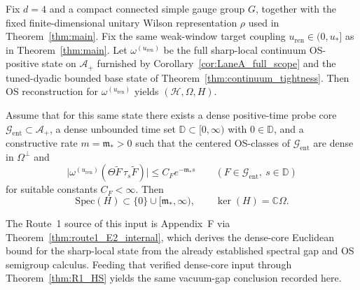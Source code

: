 \label{sec:R1HS_intake}

\begin{theorem}\label{thm:R1_HS}
Fix $d=4$ and a compact connected simple gauge group $G$, together with the fixed finite-dimensional unitary Wilson representation $\rho$ used in Theorem~\ref{thm:main}.
Fix the same weak-window target coupling $u_{\mathrm{ren}}\in(0,u_\ast]$ as in Theorem~\ref{thm:main}. Let $\omega^{(u_{\mathrm{ren}})}$ be the full sharp-local continuum OS-positive state on $\mathcal A_+$ furnished by Corollary~\ref{cor:LaneA_full_scope} and the tuned-dyadic bounded base state of Theorem~\ref{thm:continuum_tightness}. Then OS reconstruction for $\omega^{(u_{\mathrm{ren}})}$ yields $(\mathcal H,\Omega,H)$.

Assume that for this same state there exists a dense positive-time probe core $\mathcal G_{\mathrm{ent}}\subset\mathcal A_+$, a dense unbounded time set $\mathbb D\subset[0,\infty)$ with $0\in\mathbb D$, and a constructive rate $m=\mathfrak m_\ast>0$ such that the centered OS-classes of $\mathcal G_{\mathrm{ent}}$ are dense in $\Omega^\perp$ and
\[
\big|\omega^{(u_{\mathrm{ren}})}(\Theta\widetilde F\,\tau_s\widetilde F)\big|\le C_F e^{-\mathfrak m_\ast s}
\qquad (F\in\mathcal G_{\mathrm{ent}},\ s\in\mathbb D)
\]
for suitable constants $C_F<\infty$.
Then
\begin{equation}\label{eq:R1_gap}
\mathrm{Spec}(H)\subset\{0\}\cup[\mathfrak m_\ast,\infty),\qquad \ker(H)=\mathbb C\Omega.
\end{equation}
\end{theorem}

The Route~1 source of this input is Appendix~F via Theorem~\ref{thm:route1_E2_internal},
which derives the dense-core Euclidean bound for the sharp-local state from the already established spectral gap and OS semigroup calculus.
Feeding that verified dense-core input through Theorem~\ref{thm:R1_HS} yields the same vacuum-gap conclusion recorded here.
